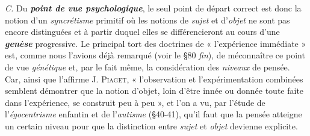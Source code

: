 {\it C.} Du \textbf{\textit {point de vue psychologique}}, le seul point de départ correct
est donc la notion d’un {\it syncrétisme} primitif où les notions de {\it sujet} et
d’{\it objet} ne sont pas encore distinguées et à partir duquel elles se différencieront
au cours d’une \textbf{\textit {genèse}} progressive. Le principal tort des
doctrines de « l’expérience immédiate » est, comme nous l’avions déjà
remarqué (voir le \S 80 {\it fin}), de méconnaître ce point de vue {\it génétique}
et, par le fait même, la considération des {\it niveaux} de pensée. Car,
ainsi que l’affirme J. \textsc{Piaget}, « l'observation et l’expérimentation
combinées semblent démontrer que la notion d’objet, loin d’être
innée ou donnée toute faite dans l’expérience, se construit peu à peu »,
et l’on a vu, par l’étude de l’{\it égocentrisme} enfantin et de l’{\it autisme}
(\S 40-41), qu’il faut que la pensée atteigne un certain niveau pour que
la distinction entre {\it sujet} et {\it objet} devienne explicite.

